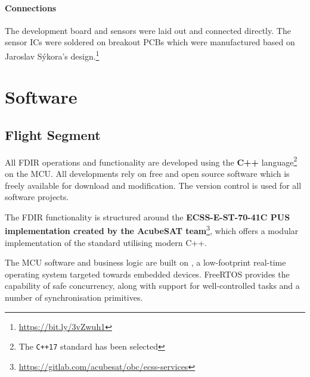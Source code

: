 \documentclass[a4paper,nobib]{tufte-book}
\begin{document}
\paragraph{Connections}
The development board and sensors were laid out and connected directly. The sensor \acp{IC} were soldered on breakout \acp{PCB} which were manufactured based on Jaroslav Sýkora's design.\footnote{\url{https://bit.ly/3vZwuh1}}

\section{Software}

\subsection{Flight Segment}

All \ac{FDIR} operations and functionality are developed using the \textbf{C++} language\footnote{The \texttt{C++17} standard has been selected} on the \ac{MCU}. All developments rely on free and open source software which is freely available for download and modification. The  version control is used for all software projects.

The \ac{FDIR} functionality is structured around the \textbf{ECSS-E-ST-70-41C \ac{PUS} implementation created by the AcubeSAT team}\footnote{\url{https://gitlab.com/acubesat/obc/ecss-services}}, which offers a modular implementation of the standard utilising modern C++.

The \ac{MCU} software and business logic are built on \textbf{}, a low-footprint real-time operating system targeted towards embedded devices. FreeRTOS provides the capability of safe concurrency, along with support for well-controlled tasks and a number of synchronisation primitives.
\end{document}
